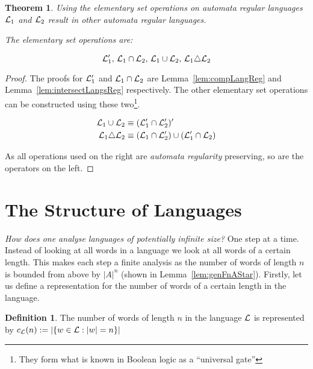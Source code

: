 \documentclass[a4paper]{article}
\newtheorem{theorem}{Theorem}[section]
\theoremstyle{definition}
\newtheorem{definition}{Definition}[section]
\theoremstyle{definition}
\theoremstyle{definition}
\begin{document}
\begin{theorem}
    \label{thm:setOpsLangReg}
    Using the elementary set operations on automata regular languages $\mathcal{L}_1$ and $\mathcal{L}_2$ result in other automata regular languages. 
    
    The elementary set operations are:

    \[
    \mathcal{L}_1^\prime ,\, \mathcal{L}_1 \cap \mathcal{L}_2 ,\, \mathcal{L}_1 \cup \mathcal{L}_2 ,\, \mathcal{L}_1 \triangle \mathcal{L}_2
    \]
\end{theorem}
\begin{proof}
    The proofs for $\mathcal{L}_1^\prime$ and $\mathcal{L}_1 \cap \mathcal{L}_2$ are Lemma~\ref{lem:compLangReg} and Lemma~\ref{lem:intersectLangsReg} respectively. The other elementary set operations can be constructed using these two\footnote{They form what is known in Boolean logic as a ``universal gate''}.
    
    \begin{align*}
    \mathcal{L}_1 \cup \mathcal{L}_2 &\equiv (\mathcal{L}_1^\prime \cap \mathcal{L}_2^\prime)^\prime
    \\
    \mathcal{L}_1 \triangle \mathcal{L}_2 &\equiv (\mathcal{L}_1 \cap \mathcal{L}_2^\prime) \cup (\mathcal{L}_1^\prime \cap \mathcal{L}_2)
    \end{align*}

    As all operations used on the right are \emph{automata regularity} preserving, so are the operators on the left.
\end{proof}

\section{The Structure of Languages}

\emph{How does one analyse languages of potentially infinite size?} One step at a time. Instead of looking at all words in a language we look at all words of a certain length. This makes each step a finite analysis as the number of words of length \(n\) is bounded from above by \(|A|^n\) (shown in Lemma~\ref{lem:genFnAStar}). Firstly, let us define a representation for the number of words of a certain length in the language.

\begin{definition}
    The number of words of length \(n\) in the language \(\mathcal{L}\) is represented by \( c_{\mathcal{L}}(n) := |\{ w \in \mathcal{L} : |w| = n \}| \)
\end{definition}
\end{document}
